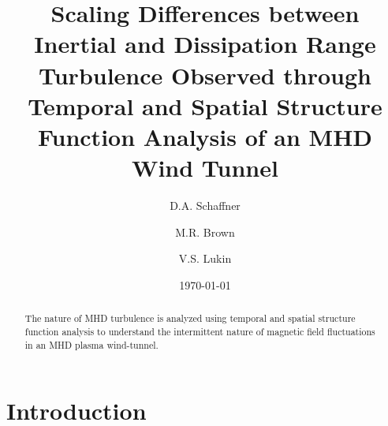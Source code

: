 \documentclass[aps,prl,amsmath,amssymb,reprint,superscriptaddress]{revtex4-1} %
\begin{document}
\title{Scaling Differences between Inertial and Dissipation Range Turbulence Observed through Temporal and Spatial Structure Function Analysis of an MHD Wind Tunnel}

\author{D.A. Schaffner}
\author{M.R. Brown}
\author{V.S. Lukin}

\date{\today}
\begin{abstract}
The nature of MHD turbulence is analyzed using temporal and spatial structure function analysis to understand the intermittent nature of magnetic field fluctuations in an MHD plasma wind-tunnel.
\end{abstract}

\maketitle

\section{Introduction}
\end{document}
